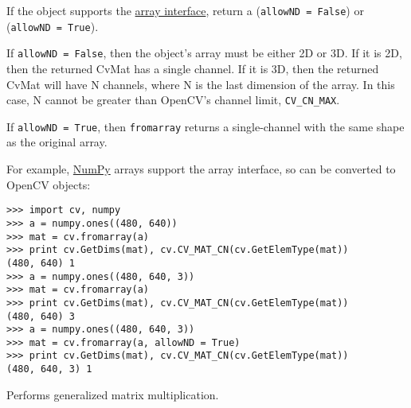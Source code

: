 If the object supports the
\href{http://docs.scipy.org/doc/numpy/reference/arrays.interface.html}{array interface},
return a  (\texttt{allowND = False}) or  (\texttt{allowND = True}).

If \texttt{allowND = False}, then the object's array must be either 2D or 3D.  If it is 2D, then the returned CvMat has a single channel.  If it is 3D, then the returned CvMat will have N channels, where N is the last dimension of the array. In this case, N cannot be greater than OpenCV's channel limit, \texttt{CV\_CN\_MAX}.

If \texttt{allowND = True}, then \texttt{fromarray} returns a single-channel  with the same shape as the original array.

For example, \href{http://numpy.scipy.org/}{NumPy} arrays support the array interface, so can be converted to OpenCV objects:

\begin{lstlisting}
>>> import cv, numpy
>>> a = numpy.ones((480, 640))
>>> mat = cv.fromarray(a)
>>> print cv.GetDims(mat), cv.CV_MAT_CN(cv.GetElemType(mat))
(480, 640) 1
>>> a = numpy.ones((480, 640, 3))
>>> mat = cv.fromarray(a)
>>> print cv.GetDims(mat), cv.CV_MAT_CN(cv.GetElemType(mat))
(480, 640) 3
>>> a = numpy.ones((480, 640, 3))
>>> mat = cv.fromarray(a, allowND = True)
>>> print cv.GetDims(mat), cv.CV_MAT_CN(cv.GetElemType(mat))
(480, 640, 3) 1
\end{lstlisting}

\fi

Performs generalized matrix multiplication.

              

\begin{description}
\end{description}

